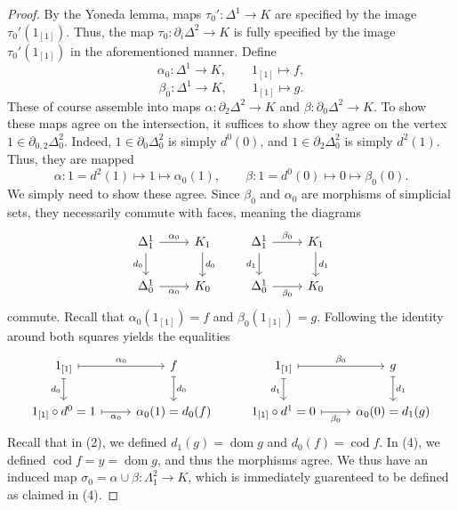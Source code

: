 \begin{proof}
	By the Yoneda lemma, maps $\tau_0':\Delta^1\to K$ are specified by the image $\tau_0'(1_{[1]} )$. Thus, the map $\tau_0 : \partial _i\Delta^2 \to K$ is fully specified by the image $\tau_0'(1_{[1]} )$ in the aforementioned manner. Define
	\[
		\alpha_0 : \Delta^1 \to K,\qquad 1_{[1]} \mapsto f,
	\]
	\[
		\beta_0 : \Delta^1 \to K,\qquad 1_{[1]} \mapsto g
	.\]
	These of course assemble into maps $\alpha : \partial _2\Delta^2 \to K$ and $\beta : \partial _0\Delta^2 \to K$. To show these maps agree on the intersection, it suffices to show they agree on the vertex $1\in \partial _{0,2} \Delta^2_0$. Indeed, $1\in \partial _0\Delta^2_0$ is simply $d^0(0)$, and $1\in \partial _2\Delta^2_0$ is simply $d^2(1)$. Thus, they are mapped
	\[
		\alpha : 1=d^2(1)\mapsto 1\mapsto \alpha_0(1),\qquad \beta : 1=d^0(0)\mapsto 0\mapsto \beta_0(0)
	.\]
	We simply need to show these agree. Since $\beta_0$ and $\alpha_0$ are morphisms of simplicial sets, they necessarily commute with faces, meaning the diagrams
	\[\begin{tikzcd}
	{\Delta^1_1} & {K_1} & {\Delta_1^1} & {K_1} \\
	{\Delta^1_0} & {K_0} & {\Delta_0^1} & {K_0}
	\arrow["{\alpha_0}", from=1-1, to=1-2]
	\arrow["{d_0}"', from=1-1, to=2-1]
	\arrow["{d_0}", from=1-2, to=2-2]
	\arrow["{\beta_0}", from=1-3, to=1-4]
	\arrow["{d_1}"', from=1-3, to=2-3]
	\arrow["{d_1}", from=1-4, to=2-4]
	\arrow["{\alpha_0}"', from=2-1, to=2-2]
	\arrow["{\beta_0}"', from=2-3, to=2-4]
	\end{tikzcd}\]
	commute. Recall that $\alpha_0(1_{[1]})=f$ and $\beta_0(1_{[1]} )=g$. Following the identity around both squares yields the equalities
	\[\begin{tikzcd}
	{1_{[1]}} & f & {1_{[1]}} & g \\
	{1_{[1]}\circ d^0=1} & {\alpha_0(1)=d_0(f)} & {1_{[1]}\circ d^1=0} & {\alpha_0(0)=d_1(g)}
	\arrow["{\alpha_0}", maps to, from=1-1, to=1-2]
	\arrow["{d_0}"', maps to, from=1-1, to=2-1]
	\arrow["{d_0}", maps to, from=1-2, to=2-2]
	\arrow["{\beta_0}", maps to, from=1-3, to=1-4]
	\arrow["{d_1}"', from=1-3, maps to, to=2-3]
	\arrow["{d_1}", from=1-4, maps to, to=2-4]
	\arrow["{\alpha_0}"', maps to, from=2-1, to=2-2]
	\arrow["{\beta_0}"', maps to, from=2-3, to=2-4]
	\end{tikzcd}\]
	Recall that in (2), we defined $d_1(g)=\operatorname{dom} g$ and $d_0(f)=\operatorname{cod} f$. In (4), we defined $\operatorname{cod} f=y=\operatorname{dom} g$, and thus the morphisms agree. We thus have an induced map $\sigma_0=\alpha\cup \beta : \Lambda_1^2\to K$, which is immediately guarenteed to be defined as claimed in (4).


\end{proof}
